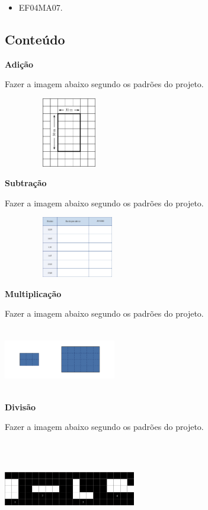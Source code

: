 \begin{enumerate}

\begin{itemize}
\item EF04MA07.
\end{itemize}

\subsection{Conteúdo}\label{conteuxfado-1}

\protect\hypertarget{_Hlk128407586}{}{}
\textbf{Adição}

Fazer a imagem abaixo segundo os padrões do projeto.

\includegraphics[width=2.26282in,height=1.19473in]{media/image27.png}

\textbf{Subtração}

Fazer a imagem abaixo segundo os padrões do projeto.

\includegraphics[width=2.55128in,height=1.04961in]{media/image28.png}

\textbf{Multiplicação}

Fazer a imagem abaixo segundo os padrões do projeto.

\includegraphics[width=1.92308in,height=1.09649in]{media/image30.png}

\textbf{Divisão}

Fazer a imagem abaixo segundo os padrões do projeto.

\includegraphics[width=2.26923in,height=1.66995in]{media/image31.png}


\end{enumerate}
